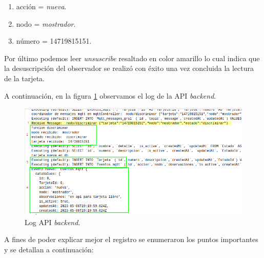 \begin{enumerate}
\item acción = \textit{nueva}.
\item nodo = \textit{mostrador}.
\item número = 14719815151.
\end{enumerate}

Por último podemos leer \textit{unsuscribe} resaltado en color amarillo lo cual indica que la desuscripción del observador se realizó con éxito una vez concluida la lectura de la tarjeta. 

A continuación, en la figura \ref{fig:ensayo-nueva-logs} observamos el log de la API \textit{backend}. 

\begin{figure}[H]
	\centering
	\includegraphics[scale=.60]{./Figures/ensayo-1/6.nueva-logs-1.png}
	\caption{Log API \textit{backend}.}
	\label{fig:ensayo-nueva-logs}
\end{figure}

A fines de poder explicar mejor el registro se enumeraron los puntos importantes y se detallan a continuación:

